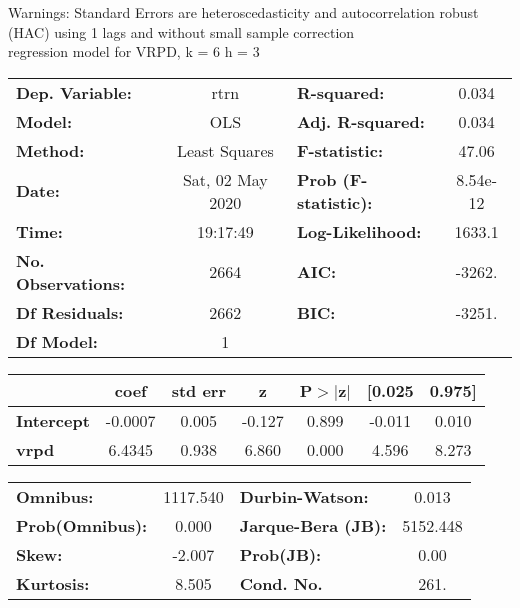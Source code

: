 Warnings: \newline
 [1] Standard Errors are heteroscedasticity and autocorrelation robust (HAC) using 1 lags and without small sample correction\\ 

regression model for VRPD, k = 6 h = 3\begin{center}
\begin{tabular}{lclc}
\toprule
\textbf{Dep. Variable:}    &       rtrn       & \textbf{  R-squared:         } &     0.034   \\
\textbf{Model:}            &       OLS        & \textbf{  Adj. R-squared:    } &     0.034   \\
\textbf{Method:}           &  Least Squares   & \textbf{  F-statistic:       } &     47.06   \\
\textbf{Date:}             & Sat, 02 May 2020 & \textbf{  Prob (F-statistic):} &  8.54e-12   \\
\textbf{Time:}             &     19:17:49     & \textbf{  Log-Likelihood:    } &    1633.1   \\
\textbf{No. Observations:} &        2664      & \textbf{  AIC:               } &    -3262.   \\
\textbf{Df Residuals:}     &        2662      & \textbf{  BIC:               } &    -3251.   \\
\textbf{Df Model:}         &           1      & \textbf{                     } &             \\
\bottomrule
\end{tabular}
\begin{tabular}{lcccccc}
                   & \textbf{coef} & \textbf{std err} & \textbf{z} & \textbf{P$> |$z$|$} & \textbf{[0.025} & \textbf{0.975]}  \\
\midrule
\textbf{Intercept} &      -0.0007  &        0.005     &    -0.127  &         0.899        &       -0.011    &        0.010     \\
\textbf{vrpd}      &       6.4345  &        0.938     &     6.860  &         0.000        &        4.596    &        8.273     \\
\bottomrule
\end{tabular}
\begin{tabular}{lclc}
\textbf{Omnibus:}       & 1117.540 & \textbf{  Durbin-Watson:     } &    0.013  \\
\textbf{Prob(Omnibus):} &   0.000  & \textbf{  Jarque-Bera (JB):  } & 5152.448  \\
\textbf{Skew:}          &  -2.007  & \textbf{  Prob(JB):          } &     0.00  \\
\textbf{Kurtosis:}      &   8.505  & \textbf{  Cond. No.          } &     261.  \\
\bottomrule
\end{tabular}
\end{center}

